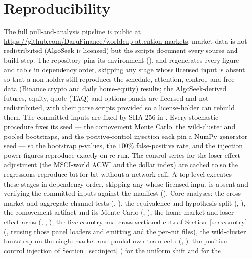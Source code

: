 \documentclass[12pt]{article}
\begin{document}
\section{Reproducibility}\label{app:repro}
The full pull-and-analysis pipeline is public at \url{https://github.com/DaruFinance/worldcup-attention-markets}; market data is not redistributed (AlgoSeek is licensed) but the scripts document every source and build step. The repository pins its environment (), and  regenerates every figure and table in dependency order, skipping any stage whose licensed input is absent so that a non-holder still reproduces the schedule, attention, control, and free-data (Binance crypto and daily home-equity) results; the AlgoSeek-derived futures, equity, quote (TAQ) and options panels are licensed and not redistributed, with their parse scripts provided so a license-holder can rebuild them. The committed inputs are fixed by SHA-256 in . Every stochastic
procedure fixes its seed --- the comovement Monte Carlo, the wild-cluster and pooled bootstraps, and the
positive-control injection each pin a NumPy generator seed --- so the bootstrap $p$-values, the $100\%$
false-positive rate, and the injection power figures reproduce exactly on re-run. The control series for
the loser-effect adjustment (the MSCI-world ACWI and the dollar index) are cached to
 so the regressions reproduce bit-for-bit without a network call. A top-level  executes these stages in dependency order, skipping any whose licensed
input is absent and verifying the committed inputs against the manifest ().
Core analyses:
the cross-market and aggregate-channel tests (, ), the
equivalence and hypothesis split (, ), the comovement
artifact and its Monte Carlo (, ), the home-market and
loser-effect arms (, , ),
the five country and cross-sectional cuts of Section~\ref{sec:country} (,
reusing those panel loaders and emitting  and the per-cut files),
the wild-cluster bootstrap on the single-market and pooled own-team cells (,
), the positive-control injection of Section~\ref{sec:inject}
( for the uniform shift and  for the
\end{document}
